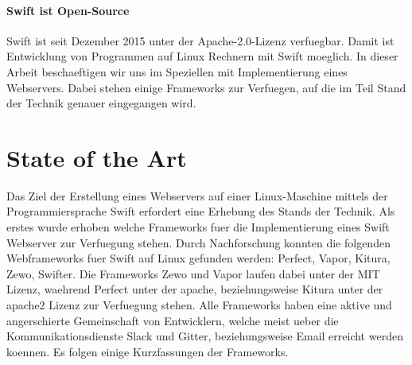 \paragraph{Swift ist Open-Source}
\label{para:swiftistopensource}
Swift ist seit Dezember 2015 unter der Apache-2.0-Lizenz verfuegbar\parencite{swiftorg}. Damit ist Entwicklung von Programmen auf Linux Rechnern mit Swift moeglich. In dieser Arbeit beschaeftigen wir uns im Speziellen mit Implementierung eines Webservers.  Dabei stehen einige Frameworks zur Verfuegen, auf die im Teil Stand der Technik genauer eingegangen wird.
\section{State of the Art}
\label{sec:stateoftheart}
Das Ziel der Erstellung eines Webservers auf einer Linux-Maschine mittels der Programmiersprache Swift erfordert eine Erhebung des Stands der Technik. Als erstes wurde erhoben welche Frameworks fuer die Implementierung eines Swift Webserver zur Verfuegung stehen. Durch Nachforschung konnten die folgenden Webframeworks fuer Swift auf Linux gefunden werden:  Perfect\parencite{perfect}, Vapor\parencite{vapor}, Kitura\parencite{kitura}, Zewo\parencite{zewo}, Swifter\parencite{swifter}. Die Frameworks Zewo und Vapor laufen dabei unter der MIT Lizenz, waehrend Perfect unter der apache, beziehungsweise Kitura unter der apache2 Lizenz zur Verfuegung stehen. Alle Frameworks haben eine aktive und angerschierte Gemeinschaft von Entwicklern, welche meist ueber die Kommunikationsdienste Slack und Gitter, beziehungsweise Email erreicht werden koennen. Es folgen einige Kurzfassungen der Frameworks. 
